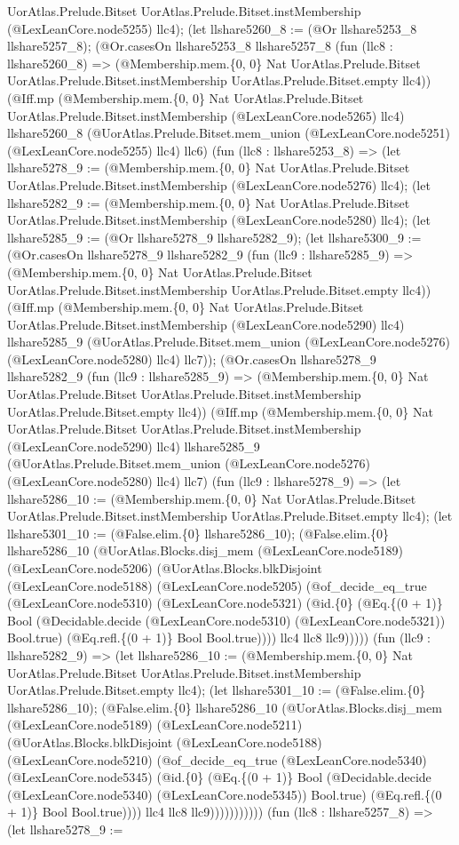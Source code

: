 \documentclass[11pt]{article}
\begin{document}
UorAtlas.Prelude.Bitset UorAtlas.Prelude.Bitset.instMembership (@LexLeanCore.node5255) llc4); (let llshare5260\_8 := (@Or llshare5253\_8 llshare5257\_8); (@Or.casesOn llshare5253\_8 llshare5257\_8 (fun (llc8 : llshare5260\_8) => (@Membership.mem.\{0, 0\} Nat UorAtlas.Prelude.Bitset UorAtlas.Prelude.Bitset.instMembership UorAtlas.Prelude.Bitset.empty llc4)) (@Iff.mp (@Membership.mem.\{0, 0\} Nat UorAtlas.Prelude.Bitset UorAtlas.Prelude.Bitset.instMembership (@LexLeanCore.node5265) llc4) llshare5260\_8 (@UorAtlas.Prelude.Bitset.mem\_union (@LexLeanCore.node5251) (@LexLeanCore.node5255) llc4) llc6) (fun (llc8 : llshare5253\_8) => (let llshare5278\_9 := (@Membership.mem.\{0, 0\} Nat UorAtlas.Prelude.Bitset UorAtlas.Prelude.Bitset.instMembership (@LexLeanCore.node5276) llc4); (let llshare5282\_9 := (@Membership.mem.\{0, 0\} Nat UorAtlas.Prelude.Bitset UorAtlas.Prelude.Bitset.instMembership (@LexLeanCore.node5280) llc4); (let llshare5285\_9 := (@Or llshare5278\_9 llshare5282\_9); (let llshare5300\_9 := (@Or.casesOn llshare5278\_9 llshare5282\_9 (fun (llc9 : llshare5285\_9) => (@Membership.mem.\{0, 0\} Nat UorAtlas.Prelude.Bitset UorAtlas.Prelude.Bitset.instMembership UorAtlas.Prelude.Bitset.empty llc4)) (@Iff.mp (@Membership.mem.\{0, 0\} Nat UorAtlas.Prelude.Bitset UorAtlas.Prelude.Bitset.instMembership (@LexLeanCore.node5290) llc4) llshare5285\_9 (@UorAtlas.Prelude.Bitset.mem\_union (@LexLeanCore.node5276) (@LexLeanCore.node5280) llc4) llc7)); (@Or.casesOn llshare5278\_9 llshare5282\_9 (fun (llc9 : llshare5285\_9) => (@Membership.mem.\{0, 0\} Nat UorAtlas.Prelude.Bitset UorAtlas.Prelude.Bitset.instMembership UorAtlas.Prelude.Bitset.empty llc4)) (@Iff.mp (@Membership.mem.\{0, 0\} Nat UorAtlas.Prelude.Bitset UorAtlas.Prelude.Bitset.instMembership (@LexLeanCore.node5290) llc4) llshare5285\_9 (@UorAtlas.Prelude.Bitset.mem\_union (@LexLeanCore.node5276) (@LexLeanCore.node5280) llc4) llc7) (fun (llc9 : llshare5278\_9) => (let llshare5286\_10 := (@Membership.mem.\{0, 0\} Nat UorAtlas.Prelude.Bitset UorAtlas.Prelude.Bitset.instMembership UorAtlas.Prelude.Bitset.empty llc4); (let llshare5301\_10 := (@False.elim.\{0\} llshare5286\_10); (@False.elim.\{0\} llshare5286\_10 (@UorAtlas.Blocks.disj\_mem (@LexLeanCore.node5189) (@LexLeanCore.node5206) (@UorAtlas.Blocks.blkDisjoint (@LexLeanCore.node5188) (@LexLeanCore.node5205) (@of\_decide\_eq\_true (@LexLeanCore.node5310) (@LexLeanCore.node5321) (@id.\{0\} (@Eq.\{(0 + 1)\} Bool (@Decidable.decide (@LexLeanCore.node5310) (@LexLeanCore.node5321)) Bool.true) (@Eq.refl.\{(0 + 1)\} Bool Bool.true)))) llc4 llc8 llc9))))) (fun (llc9 : llshare5282\_9) => (let llshare5286\_10 := (@Membership.mem.\{0, 0\} Nat UorAtlas.Prelude.Bitset UorAtlas.Prelude.Bitset.instMembership UorAtlas.Prelude.Bitset.empty llc4); (let llshare5301\_10 := (@False.elim.\{0\} llshare5286\_10); (@False.elim.\{0\} llshare5286\_10 (@UorAtlas.Blocks.disj\_mem (@LexLeanCore.node5189) (@LexLeanCore.node5211) (@UorAtlas.Blocks.blkDisjoint (@LexLeanCore.node5188) (@LexLeanCore.node5210) (@of\_decide\_eq\_true (@LexLeanCore.node5340) (@LexLeanCore.node5345) (@id.\{0\} (@Eq.\{(0 + 1)\} Bool (@Decidable.decide (@LexLeanCore.node5340) (@LexLeanCore.node5345)) Bool.true) (@Eq.refl.\{(0 + 1)\} Bool Bool.true)))) llc4 llc8 llc9))))))))))) (fun (llc8 : llshare5257\_8) => (let llshare5278\_9 := 
\end{document}

